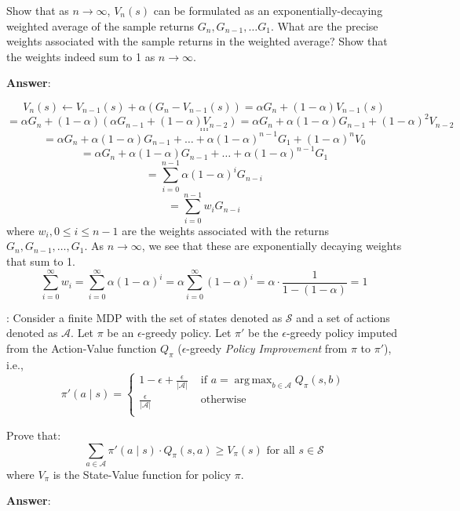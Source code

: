 \documentclass[12pt]{exam}
\DeclareMathOperator*{\argmax}{arg\,max}
\begin{document}
\begin{questions}
Show that as $n\rightarrow \infty$, $V_n(s)$ can be formulated as an exponentially-decaying weighted average of the sample returns $G_n, G_{n-1}, \ldots G_1$. What are the precise weights associated with the sample returns in the weighted average? Show that the weights indeed sum to 1 as $n\rightarrow \infty$.

{\bf Answer}: 

$$V_n(s) \leftarrow V_{n-1}(s) + \alpha(G_n - V_{n-1}(s)) = \alpha G_n + (1-\alpha) V_{n-1}(s)$$
$$ = \alpha G_n + (1-\alpha) (\alpha G_{n-1} + (1-\alpha) V_{n-2}) = \alpha G_n + \alpha (1-\alpha) G_{n-1} + (1-\alpha)^2 V_{n-2}$$
$$ \ldots $$
$$\ldots $$
$$= \alpha G_n + \alpha(1-\alpha)G_{n-1} + \ldots + \alpha (1-\alpha)^{n-1} G_1 + (1-\alpha)^n V_0$$
$$= \alpha G_n + \alpha(1-\alpha)G_{n-1} + \ldots + \alpha (1-\alpha)^{n-1} G_1$$
$$ = \sum_{i=0}^{n-1} \alpha (1-\alpha)^i G_{n-i}$$
$$ = \sum_{i=0}^{n-1} w_i G_{n-i}$$
where $w_i, 0 \leq i \leq n-1$ are the weights associated with the returns $G_n, G_{n-1}, \ldots, G_1$.
As $n\rightarrow \infty$, we see that these are exponentially decaying weights that sum to 1.
$$\sum_{i=0}^\infty w_i = \sum_{i=0}^\infty \alpha (1-\alpha)^i = \alpha \sum_{i=0}^\infty (1-\alpha)^i = \alpha \cdot \frac 1 {1- (1-\alpha)} = 1$$

\vspace{10mm}


: Consider a finite MDP with the set of states denoted as $\mathcal{S}$ and a set of actions denoted as $\mathcal{A}$. Let $\pi$ be an $\epsilon$-greedy policy. Let $\pi'$ be the $\epsilon$-greedy policy imputed from the Action-Value function $Q_{\pi}$ ($\epsilon$-greedy {\em Policy Improvement} from $\pi$ to $\pi'$), i.e.,
$$
\pi'(a \mid s) =
\begin{cases}
1 - \epsilon + \frac \epsilon {|\mathcal{A}|} & \text{ if } a = \argmax_{b \in \mathcal{A}} Q_{\pi}(s, b)\\
\frac \epsilon {|\mathcal{A}|} & \text{ otherwise}\\
\end{cases}
$$

Prove that:
$$\sum_{a \in \mathcal{A}} \pi'(a \mid s) \cdot Q_{\pi}(s,a) \geq V_{\pi}(s) \mbox{ for all } s \in \mathcal{S}$$
where $V_{\pi}$ is the State-Value function for policy $\pi$.

{\bf Answer}: 


\end{questions}
\end{document}
